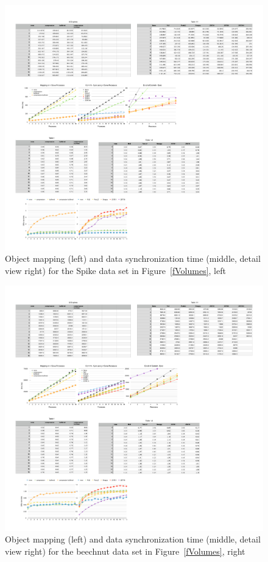 \documentclass[10pt,journal,compsoc]{IEEEtran}
\newcommand{\fig}[1]{Figure~\ref{#1}}
\begin{document}
\begin{figure}[p!]\center
  \includegraphics[height=.19\textheight]{images/spikesdist}
  \caption{\label{fSpikesDist}Object mapping (left) and data synchronization
    time (middle, detail view right) for the Spike data set in
    \fig{fVolumes}, left}
\end{figure}
\begin{figure}[p!]\center
  \includegraphics[height=.19\textheight]{images/beechnutdist}
  \caption{\label{fBeechnutDist}Object mapping (left) and data synchronization
    time (middle, detail view right) for the beechnut data set in
    \fig{fVolumes}, right}
\end{figure}
\end{document}

